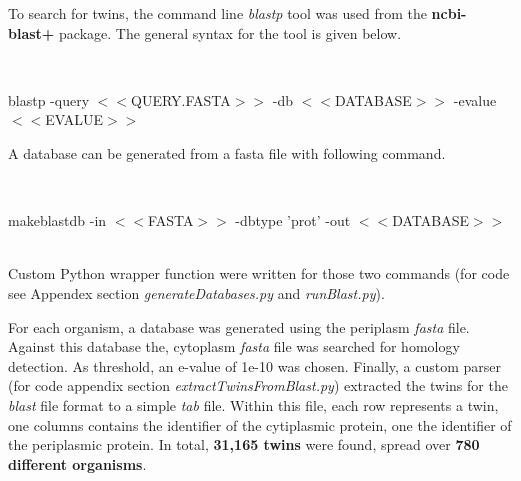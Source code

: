 To search for twins, the command line \textit{blastp} tool was used from the \textbf{ncbi-blast+} package.
The general syntax for the tool is given below.

~\begin{tcolorbox}
	blastp -query $<<$QUERY.FASTA$>>$ -db $<<$DATABASE$>>$ -evalue $<<$EVALUE$>>$
~\end{tcolorbox}

A database can be generated from a fasta file with following command.

~\begin{tcolorbox}
	makeblastdb -in $<<$FASTA$>>$ -dbtype 'prot' -out $<<$DATABASE$>>$
~\end{tcolorbox}

Custom Python wrapper function were written for those two commands
(for code see Appendex section \textit{generateDatabases.py} and \textit{runBlast.py}).

For each organism, a database was generated using the periplasm \textit{fasta} file.
Against this database the, cytoplasm \textit{fasta} file was searched for homology detection.
As threshold, an e-value of 1e-10 was chosen.
Finally, a custom parser (for code appendix section \textit{extractTwinsFromBlast.py})
extracted the twins for the \textit{blast} file format to a simple \textit{tab} file.
Within this file, each row represents a twin, one columns contains the identifier of the cytiplasmic protein, one the identifier of the periplasmic protein.
In total, \textbf{31,165 twins} were found,
spread over \textbf{780 different organisms}.
